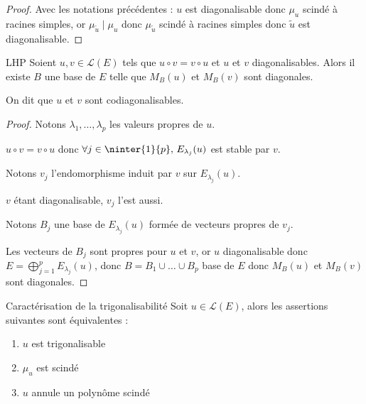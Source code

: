 \begin{proof}
    Avec les notations précédentes : $u$ est diagonalisable donc $\mu_u$
    scindé à racines simples, or $\mu_{\tilde u} \mid \mu_u$ donc $\mu_{\tilde u}$ 
    scindé à racines simples donc $\tilde u$ est diagonalisable.
\end{proof}

\begin{corollaire}{LHP}{}
    Soient $u, v \in \mathscr L(E)$ tels que $u \circ v = v \circ u$ et 
    $u$ et $v$ diagonalisables. Alors il existe $B$ une base de $E$ telle que 
    $M_B(u)$ et $M_B(v)$ sont diagonales.

    On dit que $u$ et $v$ sont codiagonalisables.
\end{corollaire}

\begin{proof}
    Notons $\lambda_1, \dots, \lambda_p$ les valeurs propres de $u$. 

    $u \circ v = v \circ u$ donc $\forall j \in \ninter{1}{p}, \, E_{\lambda_j}(u)$ est stable par $v$.

    Notons $v_j$ l'endomorphisme induit par $v$ sur $E_{\lambda_j}(u)$.

    $v$ étant diagonalisable, $v_j$ l'est aussi. 

    Notons $B_j$ une base de $E_{\lambda_j}(u)$ formée de vecteurs propres de $v_j$.

    Les vecteurs de $B_j$ sont propres pour $u$ et $v$, or $u$ diagonalisable donc 
    $E = \displaystyle \bigoplus_{j = 1 }^{ p } E_{\lambda_j}(u)$, donc 
    $B = B_1 \cup \dots \cup B_p$ base de $E$ donc $M_B(u)$ et $M_B(v)$ sont diagonales.
\end{proof}

\begin{theoreme}{Caractérisation de la trigonalisabilité}{}
    Soit $u \in \mathscr L(E)$, alors les assertions suivantes sont équivalentes :  
    \begin{enumerate}
        \item $u$ est trigonalisable
        \item $\mu_u$ est scindé
        \item $u$ annule un polynôme scindé
    \end{enumerate}
\end{theoreme}

